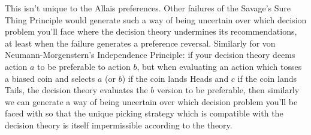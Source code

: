 \documentclass[a4paper]{article}
\newenvironment{CCM rewritten}
{\begingroup\color{blue}} %
{\endgroup}              %
\begin{document}
{
This isn't unique to the Allais preferences. Other failures of the Savage's Sure Thing Principle would generate such a way of being uncertain over which decision problem you'll face where the decision theory undermines its recommendations, at least when the failure generates a preference reversal. Similarly for von Neumann-Morgenstern's Independence Principle: if your decision theory deems action $a$ to be preferable to action $b$, but when evaluating an action which tosses a biased coin and selects $a$ (or $b$) if the coin lands Heads and $c$ if the coin lands Tails, the decision theory evaluates the $b$ version to be preferable, then similarly we can generate a way of being uncertain over which decision problem you'll be faced with so that the unique picking strategy which is compatible with the decision theory is itself impermissible according to the theory. 



}

%
\end{document}

